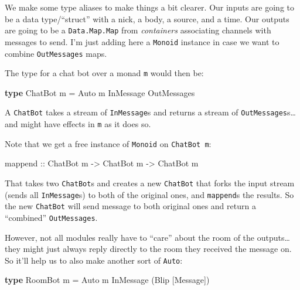 \documentclass[]{article}
\newenvironment{Shaded}{}{}
\newcommand{\KeywordTok}[1]{\textcolor[rgb]{0.00,0.44,0.13}{\textbf{{#1}}}}
\newcommand{\DataTypeTok}[1]{\textcolor[rgb]{0.56,0.13,0.00}{{#1}}}
\newcommand{\OtherTok}[1]{\textcolor[rgb]{0.00,0.44,0.13}{{#1}}}
\newcommand{\FunctionTok}[1]{\textcolor[rgb]{0.02,0.16,0.49}{{#1}}}
\newcommand{\NormalTok}[1]{{#1}}
\begin{document}
We make some type aliases to make things a bit clearer. Our inputs are
going to be a data type/``struct'' with a nick, a body, a source, and a
time. Our outputs are going to be a \texttt{Data.Map.Map} from
\emph{containers} associating channels with messages to send. I'm just
adding here a \texttt{Monoid} instance in case we want to combine
\texttt{OutMessages} maps.

The type for a chat bot over a monad \texttt{m} would then be:

\begin{Shaded}
\begin{Highlighting}[]
\KeywordTok{type} \DataTypeTok{ChatBot} \NormalTok{m }\FunctionTok{=} \DataTypeTok{Auto} \NormalTok{m }\DataTypeTok{InMessage} \DataTypeTok{OutMessages}
\end{Highlighting}
\end{Shaded}

A \texttt{ChatBot} takes a stream of \texttt{InMessage}s and returns a
stream of \texttt{OutMessages}s\ldots{}and might have effects in
\texttt{m} as it does so.

Note that we get a free instance of \texttt{Monoid} on
\texttt{ChatBot\ m}:

\begin{Shaded}
\begin{Highlighting}[]
\OtherTok{mappend ::} \DataTypeTok{ChatBot} \NormalTok{m }\OtherTok{->} \DataTypeTok{ChatBot} \NormalTok{m }\OtherTok{->} \DataTypeTok{ChatBot} \NormalTok{m}
\end{Highlighting}
\end{Shaded}

That takes two \texttt{ChatBot}s and creates a new \texttt{ChatBot} that
forks the input stream (sends all \texttt{InMessage}s) to both of the
original ones, and \texttt{mappend}s the results. So the new
\texttt{ChatBot} will send message to both original ones and return a
``combined'' \texttt{OutMessages}.

However, not all modules really have to ``care'' about the room of the
outputs\ldots{}they might just always reply directly to the room they
received the message on. So it'll help us to also make another sort of
\texttt{Auto}:

\begin{Shaded}
\begin{Highlighting}[]
\KeywordTok{type} \DataTypeTok{RoomBot} \NormalTok{m }\FunctionTok{=} \DataTypeTok{Auto} \NormalTok{m }\DataTypeTok{InMessage} \NormalTok{(}\DataTypeTok{Blip} \NormalTok{[}\DataTypeTok{Message}\NormalTok{])}
\end{Highlighting}
\end{Shaded}
\end{document}
